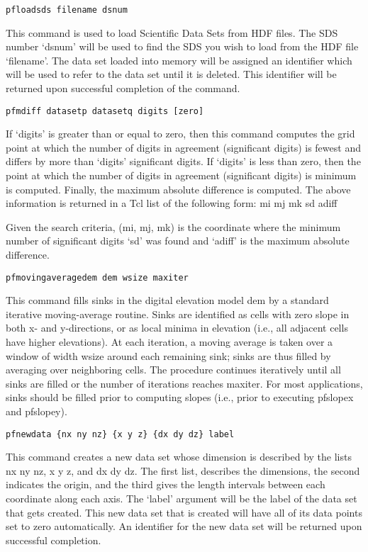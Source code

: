 \begin{description}
\item{\begin{verbatim}pfloadsds filename dsnum\end{verbatim}}
This command is used to load Scientific Data Sets from HDF files.    
The SDS number `dsnum' will be used to find the SDS you wish to load
from the HDF file `filename'.  The data set loaded into memory will
be assigned an identifier which will be used to refer to the data set
until it is deleted.  This identifier will be returned upon
successful completion of the command.  
        

\item{\begin{verbatim}pfmdiff datasetp datasetq digits [zero]\end{verbatim}}
If `digits' is greater than or equal to zero, then this command     
computes the grid point at which the number of digits in agreement    
(significant digits) is fewest and differs by more than `digits'    
significant digits.  If `digits' is less than zero, then the point  
at which the number of digits in agreement (significant digits) is    
minimum is computed.  Finally, the maximum absolute difference is     
computed.  The above information is returned in a Tcl list
of the following form:
{mi mj mk sd} adiff
   
Given the search criteria, (mi, mj, mk) is the coordinate where the
minimum number of significant digits `sd' was found and `adiff' is
the maximum absolute difference.        


\item{\begin{verbatim}pfmovingaveragedem dem wsize maxiter \end{verbatim}}
This command fills sinks in the digital elevation model dem by a standard iterative
moving-average routine. Sinks are identified as cells with zero slope in both x- and
y-directions, or as local minima in elevation (i.e., all adjacent cells have higher 
elevations). At each iteration, a moving average is taken over a window of width
wsize around each remaining sink; sinks are thus filled by averaging over neighboring
cells. The procedure continues iteratively until all sinks are filled or the number 
of iterations reaches maxiter. For most applications, sinks should be filled prior
to computing slopes (i.e., prior to executing pfslopex and pfslopey). 

        
\item{\begin{verbatim}pfnewdata {nx ny nz} {x y z} {dx dy dz} label\end{verbatim}}
This command creates a new data set whose dimension is described by
the lists {nx ny nz}, {x y z}, and {dx dy dz}.  The first list,
describes the dimensions, the second indicates the origin, and the
third gives the length intervals between each coordinate along each
axis.  The `label' argument will be the label of the data set that
gets created.  This new data set that is created will have all of
its data points set to zero automatically.  An identifier for the new
data set will be returned upon successful completion.



\end{description}
